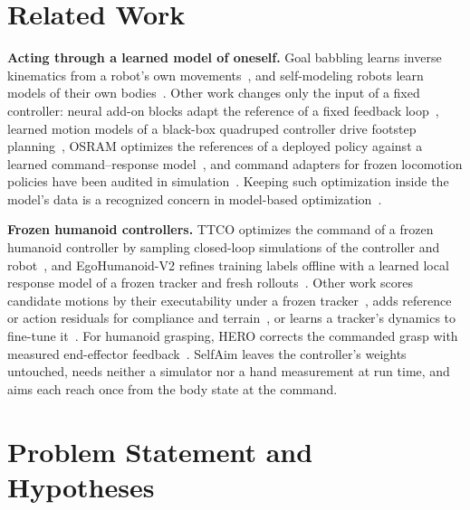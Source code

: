 \documentclass[conference]{IEEEtran}
\begin{document}
\section{Related Work}
\textbf{Acting through a learned model of oneself.} Goal babbling learns inverse kinematics from a robot's own movements~\cite{rolf2010,saggriac}, and self-modeling robots learn models of their own bodies~\cite{bongard2006}. Other work changes only the input of a fixed controller: neural add-on blocks adapt the reference of a fixed feedback loop~\cite{zhou2017dnn}, learned motion models of a black-box quadruped controller drive footstep planning~\cite{taouil2023}, OSRAM optimizes the references of a deployed policy against a learned command--response model~\cite{osram}, and command adapters for frozen locomotion policies have been audited in simulation~\cite{li2026audit}. Keeping such optimization inside the model's data is a recognized concern in model-based optimization~\cite{mins,lagrassa2024,osram}.

\textbf{Frozen humanoid controllers.} TTCO optimizes the command of a frozen humanoid controller by sampling closed-loop simulations of the controller and robot~\cite{ttco}, and EgoHumanoid-V2 refines training labels offline with a learned local response model of a frozen tracker and fresh rollouts~\cite{egohumanoidv2}. Other work scores candidate motions by their executability under a frozen tracker~\cite{s3,texedo}, adds reference or action residuals for compliance and terrain~\cite{ila,graft}, or learns a tracker's dynamics to fine-tune it~\cite{humanoidndm}. For humanoid grasping, HERO corrects the commanded grasp with measured end-effector feedback~\cite{hero}. SelfAim leaves the controller's weights untouched, needs neither a simulator nor a hand measurement at run time, and aims each reach once from the body state at the command.

\section{Problem Statement and Hypotheses}\label{sec:hyp}
\end{document}
